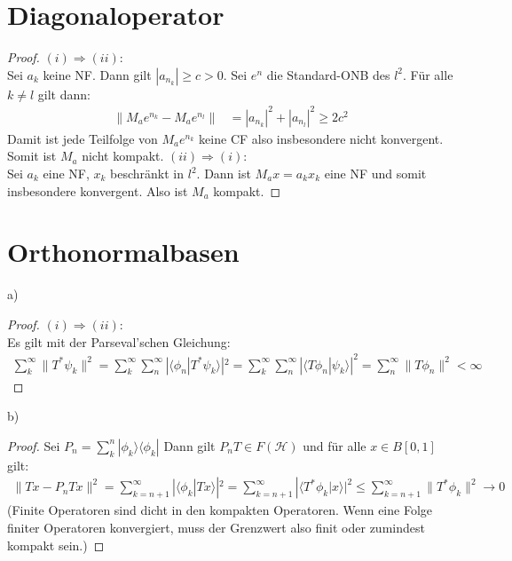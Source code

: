 \documentclass[a4paper,12pt]{article}
\newcommand{\brak}{}
\newcommand{\klam}{}
\newcommand{\oper}{}
\begin{document}
\section{Diagonaloperator}
\begin{proof}
$(i)\Rightarrow(ii)$:\\
Sei $a_k$ keine NF. Dann gilt $|a_{n_k}|\ge c>0$. Sei $e^n$ die Standard-ONB des $l^2$. Für alle $k\neq l$ gilt dann:
\begin{align*}
\|M_ae^{n_k}-M_ae^{n_l}\|&=|a_{n_k}|^2+|a_{n_l}|^2\ge 2c^2
\end{align*}
Damit ist jede Teilfolge von $M_ae^{n_k}$ keine CF also insbesondere nicht konvergent. Somit ist $M_a$ nicht kompakt. 
$(ii)\Rightarrow(i)$:\\
Sei $a_k$ eine NF, $x_k$ beschränkt in $l^2$. Dann ist $M_ax=a_kx_k$ eine NF und somit insbesondere konvergent. Also ist $M_a$ kompakt.
\end{proof}
\section{Orthonormalbasen}
a)
\begin{proof}
$(i)\Rightarrow(ii)$:\\
Es gilt mit der Parseval'schen Gleichung:
\begin{align*}
\sum_k^\infty\|T^\ast\psi_k\|^2=\sum_k^\infty\sum_n^\infty|\brak\langle {\phi_n}| {T^\ast\psi_k}\rangle|^2=\sum_k^\infty\sum_n^\infty |\brak\langle {T\phi_n}| {\psi_k}\rangle|^2=\sum_n^\infty \|T\phi_n\|^2<\infty
\end{align*}
\end{proof}
b)
\begin{proof}
Sei $P_n=\sum_k^n\oper |\phi_k\rangle\langle \phi_k|$ Dann gilt $P_nT\in F(\mathcal{H})$ und für alle $x\in B\klam\left[ {0,1} \right]$ gilt:
\begin{align*}
\|Tx-P_nTx\|^2=\sum_{k=n+1}^\infty |\brak\langle {\phi_k}| {Tx}\rangle|^2=\sum_{k=n+1}^\infty |\brak\langle {T^\ast\phi_k}| {x}\rangle|^2\le\sum_{k=n+1}^\infty \|T^\ast\phi_k\|^2\rightarrow 0
\end{align*}
(Finite Operatoren sind dicht in den kompakten Operatoren. Wenn eine Folge finiter Operatoren konvergiert, muss der Grenzwert also finit oder zumindest kompakt sein.)
\end{proof}
\end{document}
